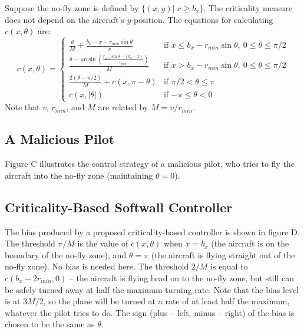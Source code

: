 \documentclass[11pt]{article}
\begin{document}
Suppose the no-fly zone is defined by $\{(x,y)|\ x \geq b_{x}\}$. The 
criticality measure does not depend on the aircraft's $y$-position. The
equations for calculating $c(x, \theta)$ are:
\[
c(x, \theta) = \left\{ \begin{array}{ll}
\frac{\theta}{M} + \frac{b_{x} - x - r_{min}\sin{\theta}}{v} & \mbox{if $x \leq b_{x} - r_{min}\sin{\theta},\ 0 \leq \theta \leq \pi/2$} \\
\frac{\theta - \arcsin{\left( \frac{r_{min}\sin{\theta}-(b_{x} - x)}{r_{min}}\right) }}{M} & \mbox{if $x > b_{x} -r_{min}\sin{\theta},\ 0 \leq \theta \leq \pi/2$} \\
\frac{2(\theta - \pi/2)}{M} + c(x, \pi - \theta) & \mbox{if $\pi/2 < \theta \leq \pi$} \\
c(x, |\theta|) & \mbox{if $-\pi \leq \theta < 0$}
\end{array}
\right.
\]
Note that $v$, $r_{min}$, and $M$ are related by $M = v/r_{min}$.

\subsection{A Malicious Pilot}

Figure C illustrates the control strategy of a malicious pilot, who tries to
fly the aircraft into the no-fly zone (maintaining $\theta = 0$).

\subsection{Criticality-Based Softwall Controller}

The bias produced by a proposed criticality-based controller is shown in figure
D. The threshold $\pi/M$ is the value of $c(x, \theta)$ when $x = b_{x}$ (the 
aircraft is on the boundary of the no-fly zone), and $\theta = \pi$ (the 
aircraft is flying straight out of the no-fly zone). No bias is needed here.
The threshold $2/M$ is equal to $c(b_{x}-2r_{min}, 0)$ -- the aircraft is flying
head on to the no-fly zone, but still can be safely turned away at half the 
maximum turning rate. Note that the bias level is at $3M/2$, so the plane will
be turned at a rate of at least half the maximum, whatever the pilot tries to
do. The sign (plus -- left, minus -- right) of the bias is chosen to be the
same as $\theta$.
\end{document}
